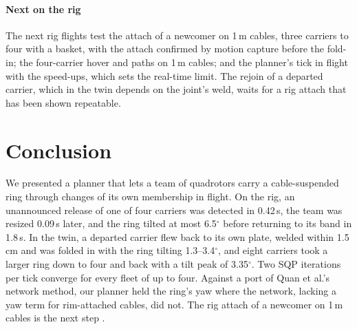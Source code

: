 \paragraph{Next on the rig}
The next rig flights test the attach of a newcomer on 1\,m cables, three carriers to four with a basket, with the
attach confirmed by motion capture before the fold-in; the four-carrier hover and paths on 1\,m cables; and the
planner's tick in flight with the speed-ups, which sets the real-time limit. The rejoin of a departed carrier, which
in the twin depends on the joint's weld, waits for a rig attach that has been shown repeatable.

\section{Conclusion}
\label{sec:conclusion}

We presented a planner that lets a team of quadrotors carry a cable-suspended ring through changes of its own
membership in flight. On the rig, an unannounced release of one of four carriers was detected in 0.42\,s, the team
was resized 0.09\,s later, and the ring tilted at most 6.5$^\circ$ before returning to its band in 1.8\,s. In the twin,
a departed carrier flew back to its own plate, welded within 1.5\,cm and was folded in with the ring tilting
1.3--3.4$^\circ$, and eight carriers took a larger ring down to four and back with a tilt peak of 3.35$^\circ$. Two SQP
iterations per tick converge for every fleet of up to four. Against a port of Quan et al.'s network method, our planner
held the ring's yaw where the network, lacking a yaw term for rim-attached cables, did not. The rig attach of a
newcomer on 1\,m cables is the next step .
